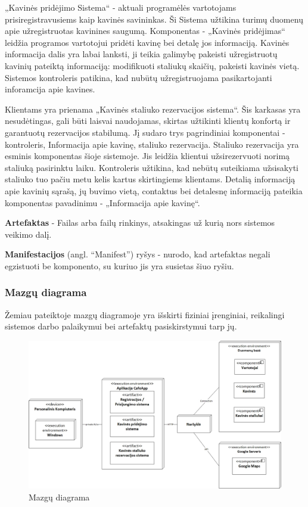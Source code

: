 \documentclass{VUMIFPSkursinis}
\begin{document}
„Kavinės pridėjimo Sistema“ - aktuali programėlės vartotojams prisiregistravusiems kaip kavinės savininkas. Ši Sistema užtikina turimų duomenų apie užregistruotas kavinines saugumą. Komponentas - „Kavinės pridėjimas“ leidžia programos vartotojui pridėti kavinę bei detalę jos informaciją. Kavinės informacija dalis yra labai lanksti, ji teikia galimybę pakeisti užregistruotų kavinių pateiktą informaciją: modifikuoti staliukų skaičių, pakeisti kavinės vietą. Sistemos kontroleris patikina, kad nubūtų užregistruojama pasikartojanti inforamcija apie kavines.

Klientams yra prienama „Kavinės staliuko rezervacijos sistema“. Šis karkasas yra nesudėtingas, gali būti laisvai naudojamas, skirtas užtikinti klientų konfortą ir garantuotų rezervacijos stabilumą. Jį sudaro trys pagrindiniai komponentai - kontroleris, Informacija apie kavinę, staliuko rezervacija. Staliuko rezervacija yra esminis komponentas šioje sistemoje. Jis leidžia klientui užsirezervuoti norimą staliuką pasirinktu laiku. Kontroleris užtikina, kad nebūtų suteikiama užsisakyti staliuko tuo pačiu metu kelis kartus skirtingiems klientams. Detalią informaciją apie kavinių sąrašą, jų buvimo vietą, contaktus bei detalesnę informaciją pateikia komponentas pavadinimu - „Informacija apie kavinę“.  

\textbf{Artefaktas} - Failas arba failų rinkinys, atsakingas už kurią nors sistemos veikimo dalį. 

\textbf{Manifestacijos} (angl. “Manifest”) ryšys - nurodo, kad artefaktas negali egzistuoti be komponento, su kuriuo jis yra susietas šiuo ryšiu.


\subsubsection{Mazgų diagrama}

Žemiau pateiktoje mazgų diagramoje yra išskirti fiziniai įrenginiai, reikalingi sistemos darbo palaikymui bei artefaktų pasiskirstymui tarp jų.
\begin{figure}[H]
    \centering
    \includegraphics[width=\textwidth,height=\textheight,keepaspectratio]{img/Deployment_diagram2} 
    \caption{Mazgų diagrama}
    \label{img:Model}
\end{figure}
\end{document}
